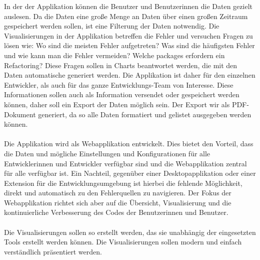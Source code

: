 In der der Applikation können die Benutzer und Benutzerinnen die Daten gezielt auslesen. Da die Daten eine große Menge an Daten über einen großen Zeitraum gespeichert werden sollen, ist eine Filterung der Daten notwendig. Die Visualisierungen in der Applikation betreffen die Fehler und versuchen Fragen zu lösen wie: Wo sind die meisten Fehler aufgetreten? Was sind die häufigsten Fehler und wie kann man die Fehler vermeiden? Welche packages erfordern ein Refactoring? Diese Fragen sollen in Charts beantwortet werden, die mit den Daten automatische generiert werden. Die Applikation ist daher für den einzelnen Entwickler, als auch für das ganze Entwicklungs-Team von Interesse. Diese Informationen sollen auch als Information versendet oder gespeichert werden können, daher soll ein Export der Daten möglich sein. Der Export wir als PDF-Dokument generiert, da so alle Daten formatiert und gelistet ausgegeben werden können. \\\\ Die Applikation wird als Webapplikation entwickelt. Dies bietet den Vorteil, dass die Daten und mögliche Einstellungen und Konfigurationen für alle Entwicklerinnen und Entwickler verfügbar sind und die Webapplikation zentral für alle verfügbar ist. Ein Nachteil, gegenüber einer Desktopapplikation oder einer Extension für die Entwicklungsumgebung ist hierbei die fehlende Möglichkeit, direkt und automatisch zu den Fehlerquellen zu navigieren. Der Fokus der Webapplikation richtet sich aber auf die Übersicht, Visualisierung und die kontinuierliche Verbesserung des Codes der Benutzerinnen und Benutzer. \\\\ Die Visualisierungen sollen so erstellt werden, das sie unabhängig der eingesetzten Tools erstellt werden können. Die Visualisierungen sollen modern und einfach verständlich präsentiert werden.



\chapterend